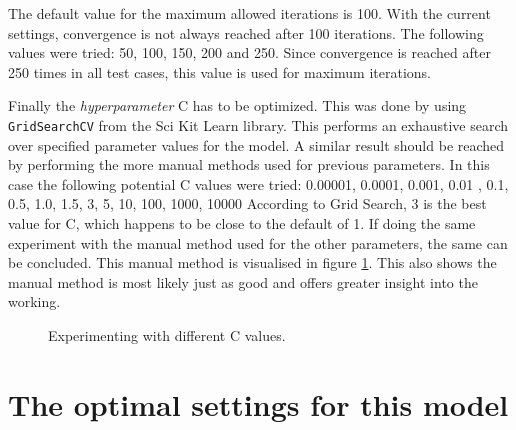 The default value for the maximum allowed iterations is 100.
With the current settings, convergence is not always reached after 100 iterations.
The following values were tried: 50, 100, 150, 200 and 250.
Since convergence is reached after 250 times in all test cases, this value is used for maximum iterations.


Finally the \textit{hyperparameter} C has to be optimized.
This was done by using \texttt{GridSearchCV} from the Sci Kit Learn library.
This performs an exhaustive search over specified parameter values for the model.
A similar result should be reached by performing the more manual methods used for previous parameters.
In this case the following potential C values were tried: 0.00001, 0.0001, 0.001, 0.01 , 0.1, 0.5, 1.0, 1.5, 3, 5, 10, 100, 1000, 10000
According to Grid Search, 3 is the best value for C, which happens to be close to the default of 1.
If doing the same experiment with the manual method used for the other parameters, the same can be concluded.
This manual method is visualised in figure \ref{fig:2-LBM-model_manual_c}.
This also shows the manual method is most likely just as good and offers greater insight into the working.

\begin{figure}[H]
    \begin{center}
    \end{center}
    \captionsetup{width=0.6\linewidth}
    \captionsetup{justification=centering}
    \caption{Experimenting with different C values.}
    \label{fig:2-LBM-model_manual_c}
\end{figure}


\section{The optimal settings for this model}
\label{section:LBM_optimal}

